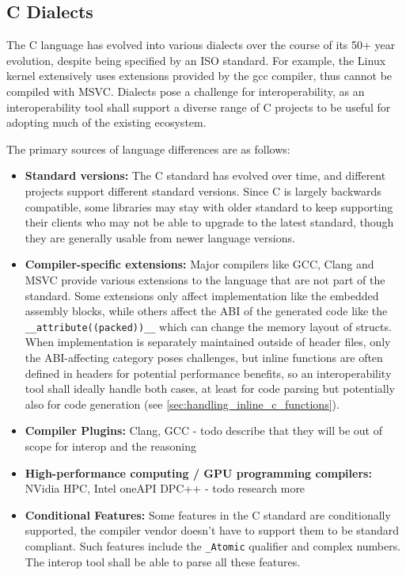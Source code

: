 \subsection{C Dialects}

The C language has evolved into various dialects over the course of its 50+ year evolution, despite being specified by an ISO standard. For example, the Linux kernel extensively uses extensions provided by the gcc compiler, thus cannot be compiled with MSVC. Dialects pose a challenge for interoperability, as an interoperability tool shall support a diverse range of C projects to be useful for adopting much of the existing ecosystem.

The primary sources of language differences are as follows:
\begin{itemize}
    \item \textbf{Standard versions:} The C standard has evolved over time, and different projects support different standard versions. Since C is largely backwards compatible, some libraries may stay with older standard to keep supporting their clients who may not be able to upgrade to the latest standard, though they are generally usable from newer language versions.
    \item \textbf{Compiler-specific extensions:} Major compilers like GCC, Clang and MSVC provide various extensions to the language that are not part of the standard. Some extensions only affect implementation like the embedded assembly blocks, while others affect the ABI of the generated code like the \verb|__attribute((packed))__| which can change the memory layout of structs. When implementation is separately maintained outside of header files, only the ABI-affecting category poses challenges, but inline functions are often defined in headers for potential performance benefits, so an interoperability tool shall ideally handle both cases, at least for code parsing but potentially also for code generation (see \autoref{sec:handling_inline_c_functions}).
    \item \textbf{Compiler Plugins:} Clang, GCC - todo describe that they will be out of scope for interop and the reasoning
    \item \textbf{High-performance computing / GPU programming compilers:} NVidia HPC, Intel oneAPI DPC++ - todo research more
    \item \textbf{Conditional Features:} Some features in the C standard are conditionally supported, the compiler vendor doesn't have to support them to be standard compliant. Such features include the \verb|_Atomic| qualifier and complex numbers. The interop tool shall be able to parse all these features.
\end{itemize}

